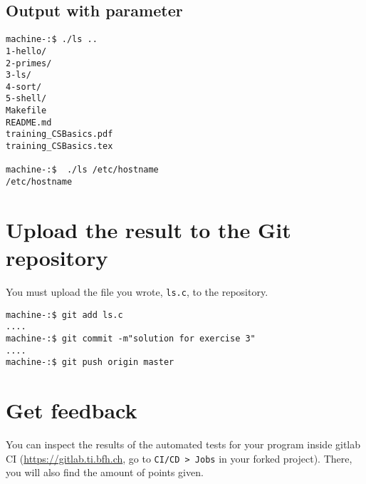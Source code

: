 \documentclass{scrartcl}
\begin{document}
\subsection{Output with parameter}

\begin{lstlisting}
machine-:$ ./ls ..
1-hello/
2-primes/
3-ls/
4-sort/
5-shell/
Makefile
README.md
training_CSBasics.pdf
training_CSBasics.tex

machine-:$  ./ls /etc/hostname
/etc/hostname
\end{lstlisting}

\section{Upload the result to the Git repository}
You must upload the file you wrote, \texttt{ls.c}, to the repository.

\begin{lstlisting}
machine-:$ git add ls.c
....
machine-:$ git commit -m"solution for exercise 3"
....
machine-:$ git push origin master
\end{lstlisting}%

\section{Get feedback}
You can inspect the results of the automated tests for your program inside gitlab CI (\url{https://gitlab.ti.bfh.ch}, go to \texttt{CI/CD > Jobs} in your forked project). There, you will also find the amount of points given.
\end{document}
